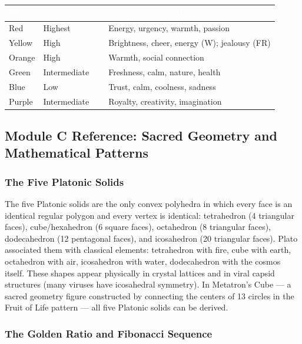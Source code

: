 \documentclass[11pt,letterpaper]{article}
\newcommand{\tableheader}[1]{\textbf{\sffamily\textcolor{white}{#1}}}
\begin{document}
\begin{center}
\begin{tabularx}{\textwidth}{L{3cm}L{4cm}X}
\toprule
{}
\tableheader{Hue} & \tableheader{Arousal Level} & \tableheader{Common Associations} \\
\midrule
Red & Highest & Energy, urgency, warmth, passion \\
Yellow & High & Brightness, cheer, energy (W); jealousy (FR) \\
Orange & High & Warmth, social connection \\
Green & Intermediate & Freshness, calm, nature, health \\
Blue & Low & Trust, calm, coolness, sadness \\
Purple & Intermediate & Royalty, creativity, imagination \\
\bottomrule
\end{tabularx}
\end{center}

\subsection{Module C Reference: Sacred Geometry and Mathematical Patterns}

\subsubsection{The Five Platonic Solids}

The five Platonic solids are the only convex polyhedra in which every face is an identical regular polygon and every vertex is identical: tetrahedron (4 triangular faces), cube/hexahedron (6 square faces), octahedron (8 triangular faces), dodecahedron (12 pentagonal faces), and icosahedron (20 triangular faces). Plato associated them with classical elements: tetrahedron with fire, cube with earth, octahedron with air, icosahedron with water, dodecahedron with the cosmos itself. These shapes appear physically in crystal lattices and in viral capsid structures (many viruses have icosahedral symmetry). In Metatron's Cube --- a sacred geometry figure constructed by connecting the centers of 13 circles in the Fruit of Life pattern --- all five Platonic solids can be derived.

\subsubsection{The Golden Ratio and Fibonacci Sequence}
\end{document}
